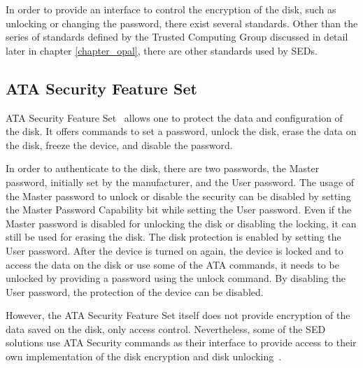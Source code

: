 In order to provide an interface to control the encryption of the disk, such as unlocking or changing the password, there exist several standards. Other than the series of standards defined by the Trusted Computing Group discussed in detail later in chapter \ref{chapter_opal}, there are other standards used by SEDs.


\subsection{ATA Security Feature Set}
\label{subsection:enc_ata}

ATA Security Feature Set~\cite{acs-3} allows one to protect the data and configuration of the disk.
It offers commands to set a password, unlock the disk, erase the data on the disk, freeze the device, and disable the password.

In order to authenticate to the disk, there are two passwords, the Master password, initially set by the manufacturer, and the User password.
The usage of the Master password to unlock or disable the security can be disabled by setting the Master Password Capability bit while setting the User password. Even if the Master password is disabled for unlocking the disk or disabling the locking, it can still be used for erasing the disk.
The disk protection is enabled by setting the User password. After the device is turned on again, the device is locked and to access the data on the disk or use some of the ATA commands, it needs to be unlocked by providing a password using the unlock command. By disabling the User password, the protection of the device can be disabled.

However, the ATA Security Feature Set itself does not provide encryption of the data saved on the disk, only access control.
Nevertheless, some of the SED solutions use ATA Security commands as their interface to provide access to their own implementation of the disk encryption and disk unlocking~\cite{self_encrypting_deception}.


